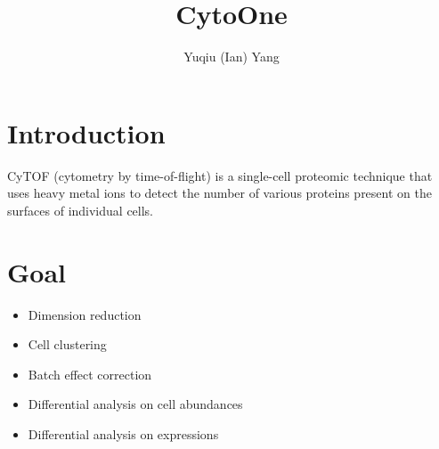 \documentclass[a4paper]{article}
\title{CytoOne}
\author{Yuqiu (Ian) Yang}
\date{}
\begin{document}
\maketitle
\section*{Introduction}
CyTOF (cytometry by time-of-flight) is a single-cell proteomic technique 
that uses heavy metal ions to detect the number of various proteins present on 
the surfaces of individual cells. 

\section*{Goal}
\begin{itemize}
    \item Dimension reduction 
    \item Cell clustering 
    \item Batch effect correction 
    \item Differential analysis on cell abundances 
    \item Differential analysis on expressions 
\end{itemize}
\end{document}
